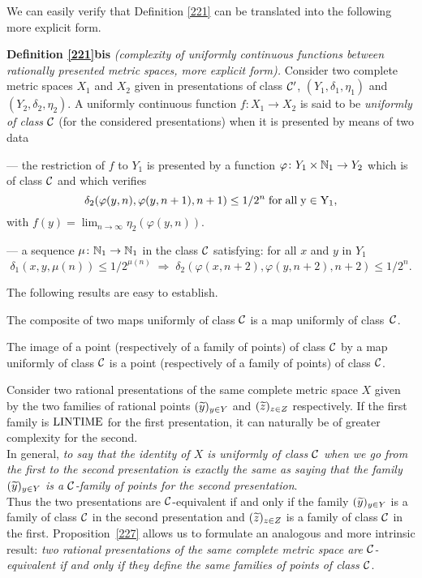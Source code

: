 We can easily verify that Definition \ref{221} can be translated into the following more explicit form. 

\mni
{\bf Definition \ref{221}bis}
{\em (complexity of uniformly continuous functions between rationally presented metric spaces, more explicit form).}
Consider two complete metric spaces $X_1$ and $X_2$ given in presentations of class ${{\cal C}}'$,  $(Y_1,\delta_1,\eta_1)$ and $(Y_2,\delta_2,\eta_2). $ A uniformly continuous function $f\colon X_1 \to X_2 $ is said to be {\em uniformly of class ${{\cal C}}$} (for the considered presentations) when it is presented by means of two data 

\noindent 
--- the restriction of $f$ to $Y_1$ is presented by a function $\varphi\colon Y_1\times \mathbb {N}_1 \to Y_2$ which is of class ${{\cal C}}$ and which verifies 
\[
\delta_2(\varphi(y,n),\varphi(y,n+1),n+1) \leq 1/2^n \; \rm{for \; all} \; 
y \in Y_1,
\]
with $f(y)=\lim_{n\to \infty}\eta_2(\varphi(y,n))$.

\noindent 
--- a sequence $\mu\colon \mathbb {N}_1 \to \mathbb {N}_1$ in the class ${{\cal C}}$ satisfying: for all $x$ and $y$ in $Y_1$
\[
\delta_1(x,y,\mu(n))\le 1/2^{\mu(n)} \; \Rightarrow\; \delta_2(\varphi(x,n+2),\varphi(y,n+2),n+2) \leq 1/2^n.
\]

\medskip
The following results are easy to establish.

\begin{proposition} \label{226}
The composite of two maps uniformly of class ${{\cal C}}$ is a map uniformly of class~${{\cal C}}$. 
\end{proposition}

\begin{proposition} \label{227}
The image of a point (respectively of a family of points) of class ${{\cal C}}$ by a map uniformly of class ${{\cal C}}$ is a point (respectively of a family of points) of class ${{\cal C}}$. 
\end{proposition}

\begin{remark} \label{228}
Consider two rational presentations of the same complete metric space $X$ given by the two families of rational points $(\widetilde{y})_{y \in Y}$ and $(\widetilde{z})_{z \in Z}$ respectively. If the first family is ${\rm LINTIME} $ for the first presentation, it can naturally be of greater complexity for the second. \\
In general, {\em to say that the identity of $X$ is uniformly of class ${{\cal C}}$ when we go from the first to the second presentation is exactly the same as saying that the family $(\widetilde{y})_{y \in Y}$ is a ${{\cal C}}$-family of points for the second presentation}. \\
Thus the two presentations are ${{\cal C}}$-equivalent if and only if the family $(\widetilde{y})_{y \in Y}$ is a family of class ${{\cal C}}$ in the second presentation and $(\widetilde{z})_{z \in Z}$ is a family of class ${{\cal C}}$ in the first. 
Proposition~\ref{227} allows us to formulate an analogous and more intrinsic result: {\em two rational presentations of the same complete metric space are ${{\cal C}}$-equivalent if and only if they define the same families of points of class ${{\cal C}}$}.
\end{remark}

